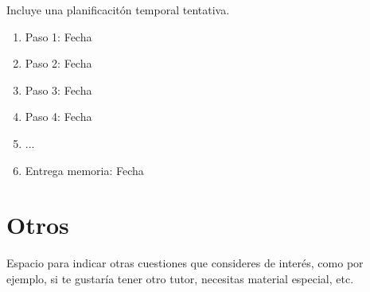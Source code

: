 \documentclass[10pt]{article}
\begin{document}
Incluye una planificacitón temporal tentativa. 

\begin{enumerate}
  \item Paso 1: Fecha
  \item Paso 2: Fecha
  \item Paso 3: Fecha
  \item Paso 4: Fecha
  \item ...
  \item Entrega memoria: Fecha
\end{enumerate}

\section{Otros}

Espacio para indicar otras cuestiones que consideres de interés, como por ejemplo, si te gustaría tener otro tutor, necesitas material especial, etc.
\end{document}
